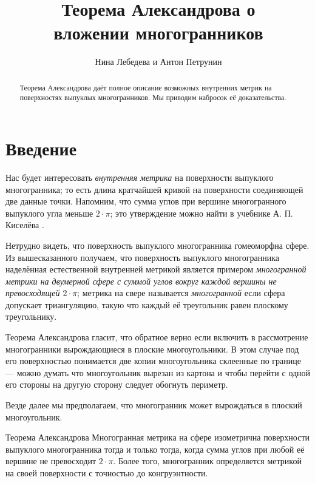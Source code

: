 \documentclass[oneside,a4paper]{article}
\begin{document}
\pagestyle{empty}

\title{Теорема Александрова о\\ вложении многогранников}
\author{Нина Лебедева и Антон Петрунин}
\date{}
\maketitle

\begin{abstract}
Теорема Александрова даёт полное описание возможных внутренних метрик на поверхностях выпуклых многогранников.
Мы приводим набросок её доказательства.
\end{abstract}

\section{Введение}

Нас будет интересовать \emph{внутренняя метрика} на поверхности выпуклого многогранника;
то есть длина кратчайшей кривой на поверхности соединяющей две данные точки.
Напомним, что сумма углов при вершине многогранного выпуклого угла меньше $2\cdot \pi$; это утверждение можно найти в учебнике А. П. Киселёва \cite[§~325]{kiselyov}.

Нетрудно видеть, что поверхность выпуклого многогранника гомеоморфна сфере.
Из вышесказанного получаем, что поверхность выпуклого многогранника наделённая естественной внутренней метрикой
является примером \emph{многогранной метрики на двумерной сфере с суммой углов вокруг каждой вершины не превосходящей $2\cdot\pi$}; 
метрика на свере называется \emph{многогранной} если сфера допускает триангуляцию, 
такую что каждый её треугольник равен плоскому треугольнику.

Теорема Александрова гласит, что обратное верно если включить в рассмотрение многогранники вырождающиеся в плоские многоугольники.
В этом случае под его поверхностью понимается две копии многоугольника склеенные по границе
--- можно думать что многоугольник вырезан из картона и чтобы перейти с одной его стороны на другую сторону следует обогнуть периметр.

Везде далее мы предполагаем, что многогранник может вырождаться в плоский многоугольник.


\begin{thm}{Теорема Александрова}
Многогранная метрика на сфере изометрична поверхности выпуклого многогранника тогда и только тогда, когда сумма углов при любой её вершине не превосходит $2\cdot\pi$.
Более того, многогранник определяется метрикой на своей поверхности с точностью до конгруэнтности.
\end{thm}
\end{document}
